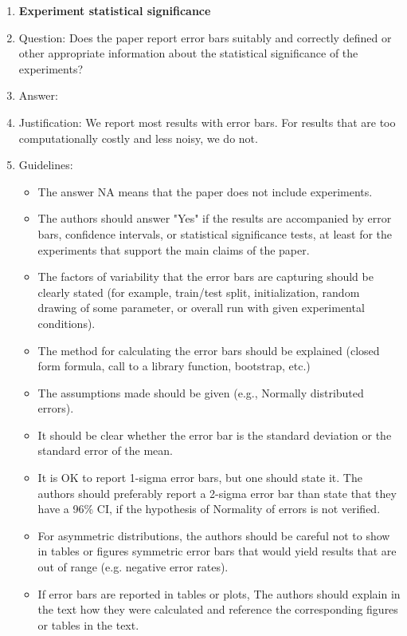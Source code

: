 \documentclass{article}
\begin{document}
\begin{enumerate}
\item {\bf Experiment statistical significance}
    \item[] Question: Does the paper report error bars suitably and correctly defined or other appropriate information about the statistical significance of the experiments?
    \item[] Answer: \answerYes{} %
    \item[] Justification: We report most results with error bars. For results that are too computationally costly and less noisy, we do not.
    \item[] Guidelines:
    \begin{itemize}
        \item The answer NA means that the paper does not include experiments.
        \item The authors should answer "Yes" if the results are accompanied by error bars, confidence intervals, or statistical significance tests, at least for the experiments that support the main claims of the paper.
        \item The factors of variability that the error bars are capturing should be clearly stated (for example, train/test split, initialization, random drawing of some parameter, or overall run with given experimental conditions).
        \item The method for calculating the error bars should be explained (closed form formula, call to a library function, bootstrap, etc.)
        \item The assumptions made should be given (e.g., Normally distributed errors).
        \item It should be clear whether the error bar is the standard deviation or the standard error of the mean.
        \item It is OK to report 1-sigma error bars, but one should state it. The authors should preferably report a 2-sigma error bar than state that they have a 96\% CI, if the hypothesis of Normality of errors is not verified.
        \item For asymmetric distributions, the authors should be careful not to show in tables or figures symmetric error bars that would yield results that are out of range (e.g. negative error rates).
        \item If error bars are reported in tables or plots, The authors should explain in the text how they were calculated and reference the corresponding figures or tables in the text.
    \end{itemize}


\end{enumerate}
\end{document}
